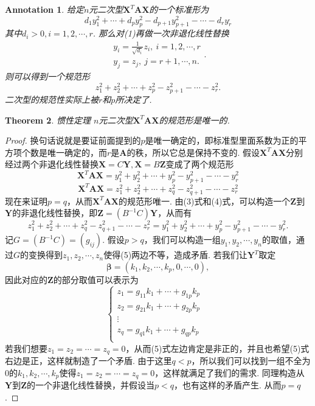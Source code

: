 \documentclass{article}
\newtheorem{theorem}{Theorem}[section]
\newtheorem{annotation}[theorem]{Annotation}
\newcommand{\mbf}[1]{\bm{#1}}
\begin{document}
\begin{annotation}
\rm 给定$n$元二次型$\mbf{X}^T\mbf{A}\mbf{X}$的一个标准形为
\begin{equation}
d_1y_1^2 + \cdots + d_py_p^2 - d_{p+1}y_{p+1}^2 - \cdots - d_ry_r^,
\end{equation}
其中$d_i > 0, i = 1,2,\cdots,r$. 那么对(1)再做一次非退化线性替换
$$
\begin{array}{ll}
y_i = \frac{1}{\sqrt{d_i}}z_i, ~i = 1,2,\cdots,r \\
y_j = z_j,~j=r+1,\cdots,n.
\end{array}.
$$ 
则可以得到一个规范形
\begin{equation}
z_1^2 + z_2^2 + \cdots + z_p^2 - z_{p+1}^2 -\cdots - z_{r}^2. 
\end{equation}
二次型的规范性实际上被$r$和$p$所决定了. 
\end{annotation}

\begin{theorem}
\rm {\color{red} 惯性定理} $n$元二次型$\mbf{X}^T\mbf{A}\mbf{X}$的规范形是唯一的. 
\end{theorem}

\begin{proof}
\rm 换句话说就是要证前面提到的$p$是唯一确定的，即标准型里面系数为正的平方项个数是唯一确定的，而$r$是$\mbf{A}$的秩，所以它总是保持不变的. 假设$\mbf{X}^T\mbf{A}\mbf{X}$分别经过两个非退化线性替换$\mbf{X} = C \mbf{Y}, \mbf{X} = B\mbf{Z}$变成了两个规范形
\begin{equation}
\mbf{X}^T\mbf{A}\mbf{X} = y_1^2+y_2^2 + \cdots + y_p^2 - y_{p+1}^2 - \cdots - y_{r}^2
\end{equation}
\begin{equation}
\mbf{X}^T\mbf{A}\mbf{X} = z_1^2+z_2^2 + \cdots + z_q^2 - z_{q+1}^2 - \cdots - z_{r}^2
\end{equation} 
现在来证明$p=q$，从而$\mbf{X}^T\mbf{A}\mbf{X}$的规范形唯一. 由(3)式和(4)式，可以构造一个$\mbf{Z}$到$\mbf{Y}$的非退化线性替换，即$\mbf{Z} =(B^{-1}C)\mbf{Y}$，从而有
\begin{equation}
z_1^2+z_2^2 + \cdots + z_q^2 - z_{q+1}^2 - \cdots - z_{r}^2 = y_1^2+y_2^2 + \cdots + y_p^2 - y_{p+1}^2 - \cdots - y_{r}^2.
\end{equation}
记$G = (B^{-1}C)=(g_{ij})$. 假设$p > q$，我们可以构造一组$y_1,y_2,\cdots,y_n$的取值，通过$G$的变换得到$z_1,z_2,\cdots,z_n$使得(5)两边不等，造成矛盾. 若我们让$\mbf{Y}^T$取定
$$
\mbf{\beta} = (k_1,k_2,\cdots,k_p,0,\cdots,0),
$$
因此对应的$\mbf{Z}$的部分取值可以表示为
$$
\left\{
\begin{array}{cl}
z_1 = g_{11}k_1+ \cdots + g_{1p}k_p & \\
z_2 = g_{21}k_1+ \cdots + g_{2p}k_p &\\ 
\vdots& \\
z_q = g_{q1}k_1+ \cdots + g_{qp}k_p &\\ 
\end{array}
\right.
$$
若我们想要$z_1 = z_2 = \cdots = z_q = 0$，从而(5)式左边肯定是非正的，并且也希望(5)式右边是正，这样就制造了一个矛盾. 由于这里$q < p$，所以我们可以找到一组不全为0的$k_1,k_2,\cdots,k_p$使得$z_1 = z_2 = \cdots = z_q = 0$，这样就满足了我们的需求. 同理构造从$\mbf{Y}$到$\mbf{Z}$的一个非退化线性替换，并假设当$p < q$，也有这样的矛盾产生. 从而$p = q$. 
\end{proof}
\end{document}
